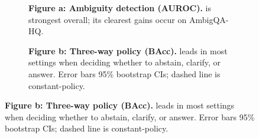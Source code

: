 \begin{figure}[t]
    \centering
    \begin{subfigure}[t]{0.38\linewidth}
        \centering
        \resizebox{\linewidth}{!}{%
            \makebox[327pt][l]{%
                \hspace*{-120pt}%
            }%
        }
        \vspace{0.2em}
        \captionsetup{labelformat=empty} %
        \caption[short]{\textbf{Figure \thefigure{}a: Ambiguity detection (AUROC).} \circleclar{} is strongest overall; its clearest gains occur on AmbigQA-HQ.}
        \label{fig:qa_ambiguity_detection}
    \end{subfigure}\hfill%
    \begin{subfigure}[t]{0.58\linewidth}
        \centering
        \resizebox{\linewidth}{!}{%
        }
        \vspace{0.2em}
        \captionsetup{labelformat=empty} %
        \caption[short]{\textbf{Figure \thefigure{}b: Three-way policy (BAcc).} \circleclar{} leads in most settings when deciding whether to abstain, clarify, or answer. Error bars 95\% bootstrap CIs; dashed line is constant-policy.}
        \label{fig:qa_response_policy}
    \end{subfigure}
    \label{fig:qa_downstream}
\end{figure}






